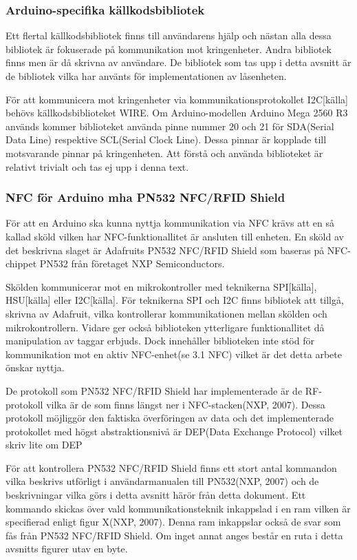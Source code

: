 \documentclass[11pt]{article}
\begin{document}
\subsubsection{Arduino-specifika källkodsbibliotek}
Ett flertal källkodsbibliotek finns till användarens hjälp och nästan alla dessa bibliotek är fokuserade på kommunikation mot kringenheter. Andra bibliotek finns men är då skrivna av användare. De bibliotek som tas upp i detta avsnitt är de bibliotek vilka har använts för implementationen av låsenheten.

För att kommunicera mot kringenheter via kommunikationsprotokollet I2C[källa] behövs källkodsbiblioteket WIRE. Om Arduino-modellen Arduino Mega 2560 R3 används kommer biblioteket använda pinne nummer 20 och 21 för SDA(Serial Data Line) respektive SCL(Serial Clock Line). Dessa pinnar är kopplade till motsvarande pinnar på kringenheten. Att förstå och använda biblioteket är relativt trivialt och tas ej upp i denna text.


\subsubsection{NFC för Arduino mha PN532 NFC/RFID Shield}
För att en Arduino ska kunna nyttja kommunikation via NFC krävs att en så kallad sköld vilken har NFC-funktionallitet är ansluten till enheten. En sköld av det beskrivna slaget är Adafruits PN532 NFC/RFID Shield som baseras på NFC-chippet PN532 från företaget NXP Semiconductors. 

Skölden kommunicerar mot en mikrokontroller med teknikerna SPI[källa], HSU[källa] eller I2C[källa]. För teknikerna SPI och I2C finns bibliotek att tillgå, skrivna av Adafruit, vilka kontrollerar kommunikationen mellan skölden och mikrokontrollern. Vidare ger också biblioteken ytterligare funktionallitet då manipulation av taggar erbjuds. Dock innehåller biblioteken inte stöd för kommunikation mot en aktiv NFC-enhet(se 3.1 NFC) vilket är det detta arbete önskar nyttja.

De protokoll som PN532 NFC/RFID Shield har implementerade är de RF-protokoll vilka är de som finns längst ner i NFC-stacken(NXP, 2007). Dessa protokoll möjliggör den faktiska överföringen av data och det implementerade protokollet med högst abstraktionsnivå är DEP(Data Exchange Protocol) vilket skriv lite om DEP

För att kontrollera PN532 NFC/RFID Shield finns ett stort antal kommandon vilka beskrivs utförligt i användarmanualen till PN532(NXP, 2007) och de beskrivningar vilka görs i detta avsnitt härör från detta dokument. Ett kommando skickas över vald kommunikationsteknik inkappslad i en ram vilken är specifierad enligt figur X(NXP, 2007). Denna ram inkappslar också de svar som fås från PN532 NFC/RFID Shield. Om inget annat anges består en ruta i detta avsnitts figurer utav en byte.
\end{document}
